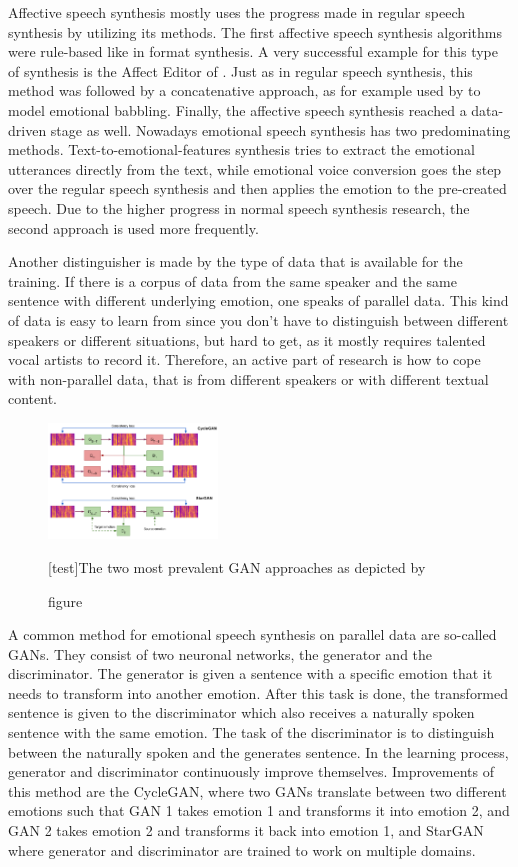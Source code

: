 \documentclass[11pt]{article}
\begin{document}
Affective speech synthesis mostly uses the progress made in regular speech synthesis by utilizing its methods. The first affective speech synthesis algorithms were rule-based like in format synthesis. A very successful example for this type of synthesis is the Affect Editor of \cite{cahn_generation_2000}. Just as in regular speech synthesis, this method was followed by a concatenative approach, as for example used by \cite{pierre-yves_production_2003} to model emotional babbling. Finally, the affective speech synthesis reached a data-driven stage as well.
Nowadays emotional speech synthesis has two predominating methods. Text-to-emotional-features synthesis tries to extract the emotional utterances directly from the text, while emotional voice conversion goes the step over the regular speech synthesis and then applies the emotion to the pre-created speech. Due to the higher progress in normal speech synthesis research, the second approach is used more frequently.

Another distinguisher is made by the type of data that is available for the training. If there is a corpus of data from the same speaker and the same sentence with different underlying emotion, one speaks of parallel data. This kind of data is easy to learn from since you don’t have to distinguish between different speakers or different situations, but hard to get, as it mostly requires talented vocal artists to record it. Therefore, an active part of research is how to cope with non-parallel data, that is from different speakers or with different textual content.

\begin{figure}[h]
 \centering
\includegraphics[width=0.4\textwidth]{"Bilder/GAN.PNG"}
\caption{figure}[test]{The two most prevalent GAN approaches as depicted by \cite{triantafyllopoulos_overview_2023}}
\end{figure}

A common method for emotional speech synthesis on parallel data are so-called GANs. They consist of two neuronal networks, the generator and the discriminator. The generator is given a sentence with a specific emotion that it needs to transform into another emotion. After this task is done, the transformed sentence is given to the discriminator which also receives a naturally spoken sentence with the same emotion. The task of the discriminator is to distinguish between the naturally spoken and the generates sentence. In the learning process, generator and discriminator continuously improve themselves. Improvements of this method are the CycleGAN, where two GANs translate between two different emotions such that GAN 1 takes emotion 1 and transforms it into emotion 2, and GAN 2 takes emotion 2 and transforms it back into emotion 1, and StarGAN where generator and discriminator are trained to work on multiple domains.
\end{document}
